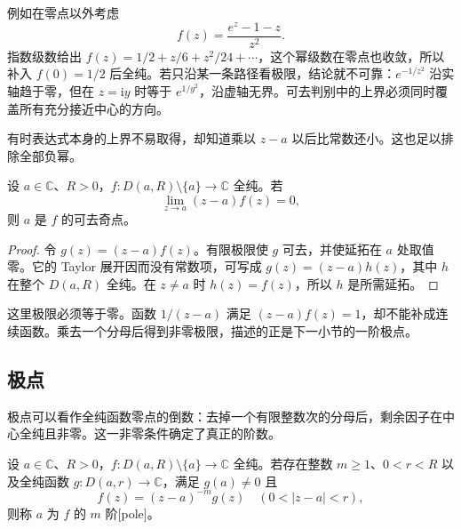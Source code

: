 例如在零点以外考虑
\[
 f(z)=\frac{e^z-1-z}{z^2}.
\]
指数级数给出 \(f(z)=1/2+z/6+z^2/24+\cdots\)，这个幂级数在零点也收敛，所以补入 \(f(0)=1/2\) 后全纯。若只沿某一条路径看极限，结论就不可靠：\(e^{-1/z^2}\) 沿实轴趋于零，但在 \(z=\mathrm{i}y\) 时等于 \(e^{1/y^2}\)，沿虚轴无界。可去判别中的上界必须同时覆盖所有充分接近中心的方向。

\ProseParagraphBreak

有时表达式本身的上界不易取得，却知道乘以 \(z-a\) 以后比常数还小。这也足以排除全部负幂。

\begin{corollary}\label{b3:cor:03-removable-small-growth}
设 \(a\in\mathbb C\)、\(R>0\)，\(f:D(a,R)\setminus\{a\}\to\mathbb C\) 全纯。若
\[
 \lim_{z\to a}(z-a)f(z)=0,
\]
则 \(a\) 是 \(f\) 的可去奇点。
\end{corollary}
\begin{proof}
令 \(g(z)=(z-a)f(z)\)。有限极限使 \(g\) 可去，并使延拓在 \(a\) 处取值零。它的 Taylor 展开因而没有常数项，可写成 \(g(z)=(z-a)h(z)\)，其中 \(h\) 在整个 \(D(a,R)\) 全纯。在 \(z\ne a\) 时 \(h(z)=f(z)\)，所以 \(h\) 是所需延拓。
\end{proof}

这里极限必须等于零。函数 \(1/(z-a)\) 满足 \((z-a)f(z)=1\)，却不能补成连续函数。乘去一个分母后得到非零极限，描述的正是下一小节的一阶极点。

\subsection{极点}
\label{b3:subsec:030202}

极点可以看作全纯函数零点的倒数：去掉一个有限整数次的分母后，剩余因子在中心全纯且非零。这一非零条件确定了真正的阶数。

\begin{definition}\label{b3:def:03-pole}
设 \(a\in\mathbb C\)、\(R>0\)，\(f:D(a,R)\setminus\{a\}\to\mathbb C\) 全纯。若存在整数 \(m\ge1\)、\(0<r<R\) 以及全纯函数 \(g:D(a,r)\to\mathbb C\)，满足 \(g(a)\ne0\) 且
\[
 f(z)=(z-a)^{-m}g(z)\quad(0<|z-a|<r),
\]
则称 \(a\) 为 \(f\) 的 \(m\) 阶[pole]。
\end{definition}

